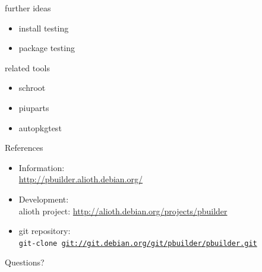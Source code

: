 \documentclass[dvipdfm,17pt,times]{beamer}
\newcommand{\emtext}[1]{
\begin{frame}{}
 
{\Huge #1
}
\end{frame}
}
\begin{document}
\begin{frame}{further ideas}
 \begin{itemize}
  \item install testing
  \item package testing
 \end{itemize}
\end{frame}

\begin{frame}{related tools}
 \begin{itemize}
  \item schroot
  \item piuparts
  \item autopkgtest
 \end{itemize}
\end{frame}

\begin{frame}[containsverbatim]{References}
\begin{itemize}
 \item Information:\\
       \url{http://pbuilder.alioth.debian.org/}

 \item Development:\\
 alioth project: \url{http://alioth.debian.org/projects/pbuilder}

 \item git repository:\\
\texttt{git-clone
  \url{git://git.debian.org/git/pbuilder/pbuilder.git}}

\end{itemize}
\end{frame}


\emtext{Questions?}
\end{document}
